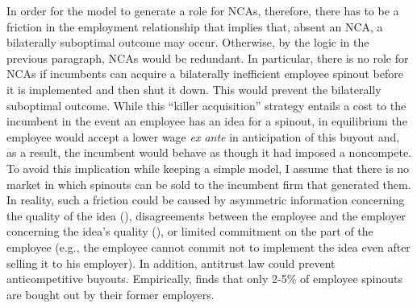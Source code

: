 \documentclass[11pt,english]{article}
\theoremstyle{definition}
\begin{document}
In order for the model to generate a role for NCAs, therefore, there has to be a friction in the employment relationship that implies that, absent an NCA, a bilaterally suboptimal outcome may occur. Otherwise, by the logic in the previous paragraph, NCAs would be redundant. In particular, there is no role for NCAs if incumbents can acquire a bilaterally inefficient employee spinout before it is implemented and then shut it down. This would prevent the bilaterally suboptimal outcome. While this ``killer acquisition'' strategy entails a cost to the incumbent in the event an employee has an idea for a spinout, in equilibrium the employee would accept a lower wage \textit{ex ante} in anticipation of this buyout and, as a result, the incumbent would behave as though it had imposed a noncompete. To avoid this implication while keeping a simple model, I assume that there is no market in which spinouts can be sold to the incumbent firm that generated them. In reality, such a friction could be caused by asymmetric information concerning the quality of the idea (\cite{chatterjee_spinoffs_2012}), disagreements between the employee and the employer concerning the idea's quality (\cite{klepper_disagreements_2007}), or limited commitment on the part of the employee (e.g., the employee cannot commit not to implement the idea even after selling it to his employer). In addition, antitrust law could prevent anticompetitive buyouts. Empirically, \cite{babina_entrepreneurial_2019} finds that only 2-5\% of employee spinouts are bought out by their former employers.
\end{document}
